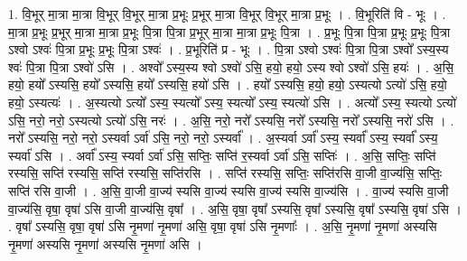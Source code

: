 \documentclass[17pt]{extarticle}
\begin{document}
1. वि॒भूर् मा॒त्रा मा॒त्रा वि॒भूर् वि॒भूर् मा॒त्रा प्र॒भूः प्र॒भूर् मा॒त्रा वि॒भूर् वि॒भूर् मा॒त्रा प्र॒भूः । . वि॒भूरिति॑ वि - भूः । . मा॒त्रा प्र॒भूः प्र॒भूर् मा॒त्रा मा॒त्रा प्र॒भूः पि॒त्रा पि॒त्रा प्र॒भूर् मा॒त्रा मा॒त्रा प्र॒भूः पि॒त्रा । . प्र॒भूः पि॒त्रा पि॒त्रा प्र॒भूः प्र॒भूः पि॒त्रा ऽश्वो ऽश्वः॑ पि॒त्रा प्र॒भूः प्र॒भूः पि॒त्रा ऽश्वः॑ । . प्र॒भूरिति॑ प्र - भूः । . पि॒त्रा ऽश्वो ऽश्वः॑ पि॒त्रा पि॒त्रा ऽश्वो᳚ ऽस्य॒स्य श्वः॑ पि॒त्रा पि॒त्रा ऽश्वो॑ ऽसि । . अश्वो᳚ ऽस्य॒स्य श्वो ऽश्वो॑ ऽसि॒ हयो॒ हयो॒ ऽस्य श्वो ऽश्वो॑ ऽसि॒ हयः॑ । . अ॒सि॒ हयो॒ हयो᳚ ऽस्यसि॒ हयो᳚ ऽस्यसि॒ हयो᳚ ऽस्यसि॒ हयो॑ ऽसि । . हयो᳚ ऽस्यसि॒ हयो॒ हयो॒ ऽस्यत्यो ऽत्यो॑ ऽसि॒ हयो॒ हयो॒ ऽस्यत्यः॑ । . अ॒स्यत्यो ऽत्यो᳚ ऽस्य॒ स्यत्यो᳚ ऽस्य॒ स्यत्यो᳚ ऽस्य॒ स्यत्यो॑ ऽसि । . अत्यो᳚ ऽस्य॒ स्यत्यो ऽत्यो॑ ऽसि॒ नरो॒ नरो॒ ऽस्यत्यो ऽत्यो॑ ऽसि॒ नरः॑ । . अ॒सि॒ नरो॒ नरो᳚ ऽस्यसि॒ नरो᳚ ऽस्यसि॒ नरो᳚ ऽस्यसि॒ नरो॑ ऽसि । . नरो᳚ ऽस्यसि॒ नरो॒ नरो॒ ऽस्यर्वा ऽर्वा॑ ऽसि॒ नरो॒ नरो॒ ऽस्यर्वा᳚ । . अ॒स्यर्वा ऽर्वा᳚ ऽस्य॒ स्यर्वा᳚ ऽस्य॒ स्यर्वा᳚ ऽस्य॒ स्यर्वा॑ ऽसि । . अर्वा᳚ ऽस्य॒ स्यर्वा ऽर्वा॑ ऽसि॒ सप्तिः॒ सप्ति॑ र॒स्यर्वा ऽर्वा॑ ऽसि॒ सप्तिः॑ । . अ॒सि॒ सप्तिः॒ सप्ति॑ रस्यसि॒ सप्ति॑ रस्यसि॒ सप्ति॑ रस्यसि॒ सप्ति॑रसि । . सप्ति॑ रस्यसि॒ सप्तिः॒ सप्ति॑रसि वा॒जी वा॒ज्य॑सि॒ सप्तिः॒ सप्ति॑ रसि वा॒जी । . अ॒सि॒ वा॒जी वा॒ज्य॑ स्यसि वा॒ज्य॑ स्यसि वा॒ज्य॑ स्यसि वा॒ज्य॑सि । . वा॒ज्य॑ स्यसि वा॒जी वा॒ज्य॑सि॒ वृषा॒ वृषा॑ ऽसि वा॒जी वा॒ज्य॑सि॒ वृषा᳚ । . अ॒सि॒ वृषा॒ वृषा᳚ ऽस्यसि॒ वृषा᳚ ऽस्यसि॒ वृषा᳚ ऽस्यसि॒ वृषा॑ ऽसि । . वृषा᳚ ऽस्यसि॒ वृषा॒ वृषा॑ ऽसि नृ॒मणा॑ नृ॒मणा॑ असि॒ वृषा॒ वृषा॑ ऽसि नृ॒मणाः᳚ । . अ॒सि॒ नृ॒मणा॑ नृ॒मणा॑ अस्यसि नृ॒मणा॑ अस्यसि नृ॒मणा॑ अस्यसि नृ॒मणा॑ असि । \newline
\end{document}
